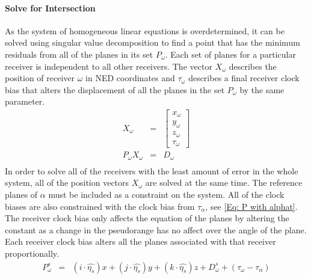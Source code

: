 \paragraph{Solve for Intersection}
As the system of homogeneous linear equations is overdetermined, it can be solved using singular value decomposition to find a point that has the minimum residuals from all of the planes in its set $P_\omega$. Each set of planes for a particular receiver is independent to all other receivers. The vector $X_\omega$ describes the position of receiver $\omega$ in NED coordinates and $\tau_\omega$ describes a final receiver clock bias that alters the displacement of all the planes in the set $P_\omega$ by the same parameter.
\begin{eqnarray}
X_\omega &=& \begin{bmatrix}
x_\omega \\y_\omega \\ z_\omega \\ \tau_\omega
\end{bmatrix}\\
P_\omega X_\omega &=& D_\omega \\
\end{eqnarray}
In order to solve all of the receivers with the least amount of error in the whole system, all of the position vectors $X_\omega$ are solved at the same time. The reference planes of $\alpha$ must be included as a constraint on the system. All of the clock biases are also constrained with the clock bias from $\tau_\alpha$, see \eqref{Eq: P with alphat}.
The receiver clock bias only affects the equation of the planes by altering the constant as a change in the pseudorange has no affect over the angle of the plane. Each receiver clock bias alters all the planes associated with that receiver proportionally. 
\begin{eqnarray}
P_\omega^s &=& (i\cdot\hat{\eta_s})x + (j\cdot\hat{\eta_s})y + (k\cdot\hat{\eta_s})z + D_\omega^s + (\tau_\omega-\tau_\alpha) \label{Eq: P with alphat}\\
\end{eqnarray}
 

